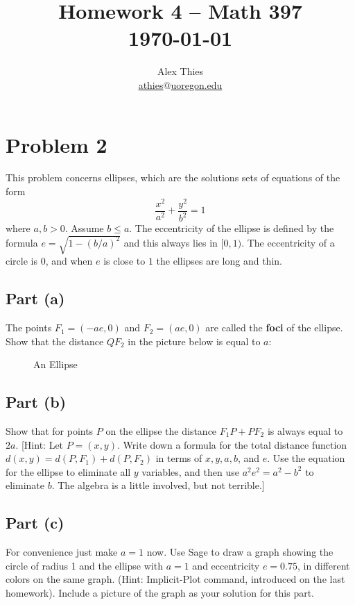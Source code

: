 \documentclass[letterpaper, 12pt]{amsart}
\theoremstyle{definition}  %
\begin{document}
	\title{Homework 4  -- Math 397 \\ \today}
	\author{Alex Thies \\ \href{mailto:athies@uoregon.edu}{\lowercase{athies$@$uoregon.edu}}}

	\maketitle

	\section*{Problem 2}
	This problem concerns ellipses, which are the solutions sets of equations of the form $$\frac{x^{2}}{a^{2}} + \frac{y^{2}}{b^{2}} = 1$$ where $a, b > 0$. 
	Assume $b \leq a$. 
	The eccentricity of the ellipse is defined by the formula $e = \sqrt{1 - (b/a)^{2}}$ and this always lies in $[0, 1)$. 
	The eccentricity of a circle is $0$, and when $e$ is close to $1$ the ellipses are long and thin.

		\subsection*{Part (a)}
		The points $F_{1} = (-ae, 0)$ and $F_{2} = (ae, 0)$ are called the \textbf{foci} of the ellipse. 
		Show that the distance $QF_{2}$ in the picture below is equal to $a$:
		\begin{figure}[h]
			\caption{An Ellipse}
			\label{ellipse}
		\end{figure}

		\subsection*{Part (b)}
		Show that for points $P$ on the ellipse the distance $F_{1}P +PF_{2}$ is always equal to $2a$.
		[Hint: Let $P = (x, y)$. 
		Write down a formula for the total distance function $d(x, y) = d(P, F_{1}) + d(P, F_{2})$ in terms of $x, y, a, b$, and $e$. 
		Use the equation for the ellipse to eliminate all $y$ variables, and then use $a^{2}e^{2} = a^{2} − b^{2}$ to eliminate $b$. 
		The algebra is a little involved, but not terrible.]

		\subsection*{Part (c)}
		For convenience just make $a = 1$ now. 
		Use Sage to draw a graph showing the circle of radius 1 and the ellipse with $a = 1$ and eccentricity $e = 0.75$, in different colors on the same graph. 
		(Hint: Implicit-Plot command, introduced on the last homework). 
		Include a picture of the graph as your solution for this part.
\end{document}
